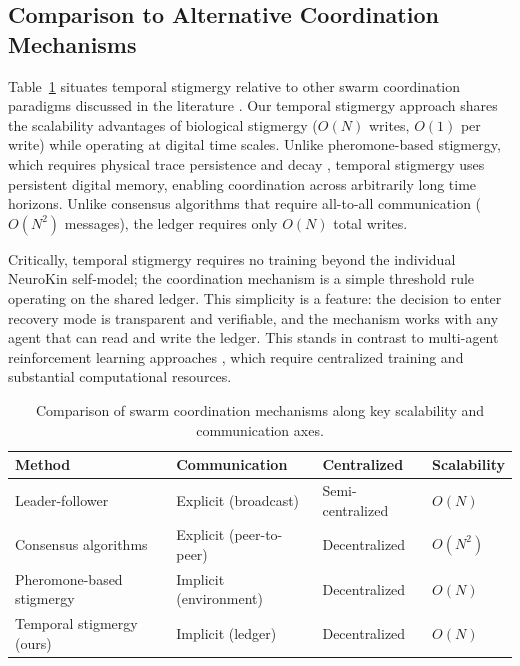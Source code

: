 \documentclass[12pt,a4paper,oneside]{report}
\begin{document}
\subsection{Comparison to Alternative Coordination Mechanisms}
\label{subsec:comparison_to_alternative_coordination_mechanisms}

Table~\ref{tab:coordination_comparison} situates temporal stigmergy relative to other swarm coordination paradigms discussed in the literature \cite{bongard2006resilient, cully2015robots, domberg2026selfadapting}. Our temporal stigmergy approach shares the scalability advantages of biological stigmergy ($O(N)$ writes, $O(1)$ per write) while operating at digital time scales. Unlike pheromone-based stigmergy, which requires physical trace persistence and decay \cite{bongard2006resilient}, temporal stigmergy uses persistent digital memory, enabling coordination across arbitrarily long time horizons. Unlike consensus algorithms that require all-to-all communication ($O(N^2)$ messages), the ledger requires only $O(N)$ total writes.

Critically, temporal stigmergy requires no training beyond the individual NeuroKin self-model; the coordination mechanism is a simple threshold rule operating on the shared ledger. This simplicity is a feature: the decision to enter recovery mode is transparent and verifiable, and the mechanism works with any agent that can read and write the ledger. This stands in contrast to multi-agent reinforcement learning approaches \cite{domberg2026selfadapting, daneshmand2026slowrl}, which require centralized training and substantial computational resources.

\begin{table}[H]
\centering
\small
\setlength{\tabcolsep}{4pt}
\caption{Comparison of swarm coordination mechanisms along key scalability and communication axes.}
\label{tab:coordination_comparison}
\begin{tabular}{>{\raggedright\arraybackslash}p{4.0cm} >{\raggedright\arraybackslash}p{4.0cm} >{\centering\arraybackslash}p{2.6cm} >{\centering\arraybackslash}p{2.6cm}}
\toprule
\textbf{Method} & \textbf{Communication} & \textbf{Centralized} & \textbf{Scalability} \\
\midrule
Leader-follower & Explicit (broadcast) & Semi-centralized & $O(N)$ \\
Consensus algorithms & Explicit (peer-to-peer) & Decentralized & $O(N^2)$ \\
Pheromone-based stigmergy & Implicit (environment) & Decentralized & $O(N)$ \\
Temporal stigmergy (ours) & Implicit (ledger) & Decentralized & $O(N)$ \\
\bottomrule
\end{tabular}
\end{table}
\end{document}
